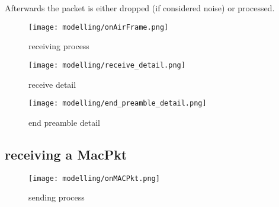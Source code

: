 Afterwards the packet is either dropped (if considered noise) or processed. 

\begin{figure}[H]
 \centering
 \texttt{[image: modelling/onAirFrame.png]}
 \caption{receiving process}
 \label{fig: receiving process}
\end{figure}

\begin{figure}[H]
 \centering
 \texttt{[image: modelling/receive\_detail.png]}
 \caption{receive detail}
 \label{fig: receive detail}
\end{figure}

\begin{figure}[H]
 \centering
 \texttt{[image: modelling/end\_preamble\_detail.png]}
 \caption{end preamble detail}
 \label{fig: end preamble detail}
\end{figure}

\newpage

\subsection{receiving a MacPkt}


\begin{figure}[H]
 \centering
 \texttt{[image: modelling/onMACPkt.png]}
 \caption{sending process}
 \label{fig: sending process}
\end{figure}







